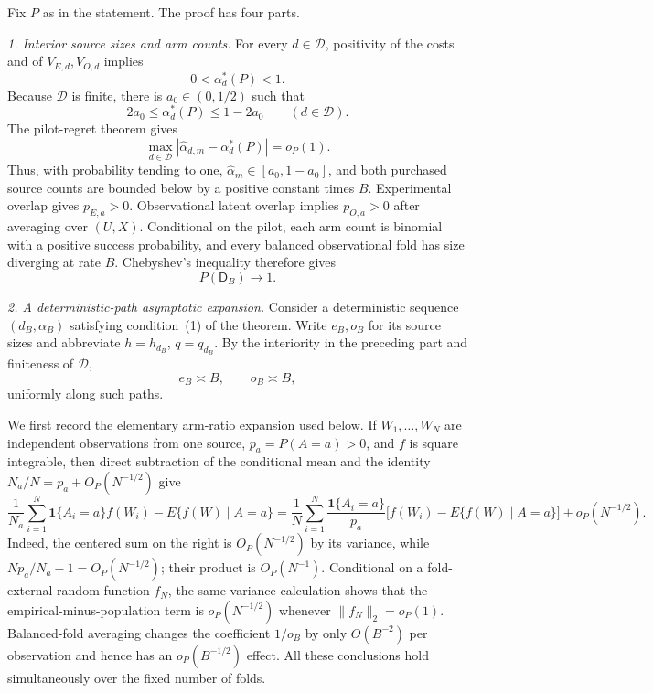 Fix \(P\) as in the statement.  The proof has four parts.

\emph{1. Interior source sizes and arm counts.}
For every \(d\in\mathcal D\), positivity of the costs and of \(V_{E,d},V_{O,d}\) implies
\[
 0<\alpha_d^*(P)<1.
\]
Because \(\mathcal D\) is finite, there is \(a_0\in(0,1/2)\) such that
\[
 2a_0\le \alpha_d^*(P)\le1-2a_0
 \qquad(d\in\mathcal D).
 \tag{1}
\]
The pilot-regret theorem gives
\[
 \max_{d\in\mathcal D}
 |\widehat\alpha_{d,m}-\alpha_d^*(P)|=o_P(1).
 \tag{2}
\]
Thus, with probability tending to one, \(\widehat\alpha_m\in[a_0,1-a_0]\), and both purchased source counts are bounded below by a positive constant times \(B\).  Experimental overlap gives \(p_{E,a}>0\).  Observational latent overlap implies \(p_{O,a}>0\) after averaging over \((U,X)\).  Conditional on the pilot, each arm count is binomial with a positive success probability, and every balanced observational fold has size diverging at rate \(B\).  Chebyshev's inequality therefore gives
\[
 P(\mathsf D_B)\longrightarrow1.
 \tag{3}
\]

\emph{2. A deterministic-path asymptotic expansion.}
Consider a deterministic sequence \((d_B,\alpha_B)\) satisfying condition~(1) of the theorem.  Write \(e_B,o_B\) for its source sizes and abbreviate \(h=h_{d_B}\), \(q=q_{d_B}\).  By the interiority in the preceding part and finiteness of \(\mathcal D\),
\[
 e_B\asymp B,\qquad o_B\asymp B,
 \tag{4}
\]
uniformly along such paths.

We first record the elementary arm-ratio expansion used below.  If \(W_1,\ldots,W_N\) are independent observations from one source, \(p_a=P(A=a)>0\), and \(f\) is square integrable, then direct subtraction of the conditional mean and the identity \(N_a/N=p_a+O_P(N^{-1/2})\) give
\[
 \frac{1}{N_a}\sum_{i=1}^N\mathbf 1\{A_i=a\}f(W_i)
 -E\{f(W)\mid A=a\}
 =\frac1N\sum_{i=1}^N\frac{\mathbf 1\{A_i=a\}}{p_a}
 \bigl[f(W_i)-E\{f(W)\mid A=a\}\bigr]
 +o_P(N^{-1/2}).
 \tag{5}
\]
Indeed, the centered sum on the right is \(O_P(N^{-1/2})\) by its variance, while \(Np_a/N_a-1=O_P(N^{-1/2})\); their product is \(O_P(N^{-1})\).  Conditional on a fold-external random function \(f_N\), the same variance calculation shows that the empirical-minus-population term is \(o_P(N^{-1/2})\) whenever \(\|f_N\|_2=o_P(1)\).  Balanced-fold averaging changes the coefficient \(1/o_B\) by only \(O(B^{-2})\) per observation and hence has an \(o_P(B^{-1/2})\) effect.  All these conclusions hold simultaneously over the fixed number of folds.

